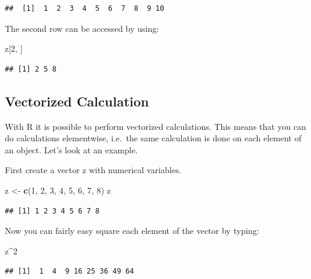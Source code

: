 \documentclass[]{book}
\newenvironment{Shaded}{\begin{snugshade}}{\end{snugshade}}
\newcommand{\KeywordTok}[1]{\textcolor[rgb]{0.13,0.29,0.53}{\textbf{#1}}}
\newcommand{\DecValTok}[1]{\textcolor[rgb]{0.00,0.00,0.81}{#1}}
\newcommand{\StringTok}[1]{\textcolor[rgb]{0.31,0.60,0.02}{#1}}
\newcommand{\OperatorTok}[1]{\textcolor[rgb]{0.81,0.36,0.00}{\textbf{#1}}}
\newcommand{\NormalTok}[1]{#1}
\begin{document}
\begin{verbatim}
##  [1]  1  2  3  4  5  6  7  8  9 10
\end{verbatim}

The second row can be accessed by using:

\begin{Shaded}
\begin{Highlighting}[]
\NormalTok{z[}\DecValTok{2}\NormalTok{, ]}
\end{Highlighting}
\end{Shaded}

\begin{verbatim}
## [1] 2 5 8
\end{verbatim}

\subsection{Vectorized Calculation}\label{vectorized-calculation}

With R it is possible to perform vectorized calculations. This means
that you can do calculations elementwise, i.e.~the same calculation is
done on each element of an object. Let's look at an example.

First create a vector z with numerical variables.

\begin{Shaded}
\begin{Highlighting}[]
\NormalTok{z <-}\StringTok{ }\KeywordTok{c}\NormalTok{(}\DecValTok{1}\NormalTok{, }\DecValTok{2}\NormalTok{, }\DecValTok{3}\NormalTok{, }\DecValTok{4}\NormalTok{, }\DecValTok{5}\NormalTok{, }\DecValTok{6}\NormalTok{, }\DecValTok{7}\NormalTok{, }\DecValTok{8}\NormalTok{)}
\NormalTok{z}
\end{Highlighting}
\end{Shaded}

\begin{verbatim}
## [1] 1 2 3 4 5 6 7 8
\end{verbatim}

Now you can fairly easy square each element of the vector by typing:

\begin{Shaded}
\begin{Highlighting}[]
\NormalTok{z}\OperatorTok{^}\DecValTok{2}
\end{Highlighting}
\end{Shaded}

\begin{verbatim}
## [1]  1  4  9 16 25 36 49 64
\end{verbatim}
\end{document}
